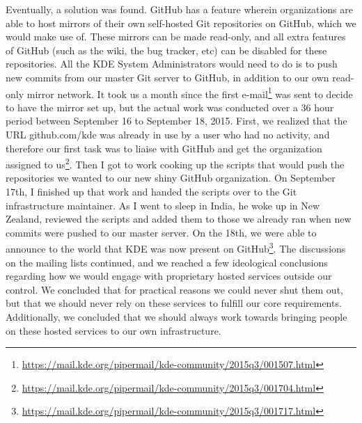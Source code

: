 Eventually, a solution was found. GitHub has a feature wherein organizations are able to host mirrors of their own self-hosted Git repositories on GitHub, which we would make use of. These mirrors can be made read-only, and all extra features of GitHub (such as the wiki, the bug tracker, etc) can be disabled for these repositories. All the KDE System Administrators would need to do is to push new commits from our master Git server to GitHub, in addition to our own read-only mirror network.
It took us a month since the first e-mail\footnote{\url{https://mail.kde.org/pipermail/kde-community/2015q3/001507.html}} was sent to decide to have the mirror set up, but the actual work was conducted over a 36 hour period between September 16 to September 18, 2015. First, we realized that the URL github.com/kde was already in use by a user who had no activity, and therefore our first task was to liaise with GitHub and get the organization assigned to us\footnote{\url{https://mail.kde.org/pipermail/kde-community/2015q3/001704.html}}. Then I got to work cooking up the scripts that would push the repositories we wanted to our new shiny GitHub organization. On September 17th, I finished up that work and handed the scripts over to the Git infrastructure maintainer. As I went to sleep in India, he woke up in New Zealand, reviewed the scripts and added them to those we already ran when new commits were pushed to our master server. On the 18th, we were able to announce to the world that KDE was now present on GitHub\footnote{\url{https://mail.kde.org/pipermail/kde-community/2015q3/001717.html}}.
The discussions on the mailing lists continued, and we reached a few ideological conclusions regarding how we would engage with proprietary hosted services outside our control. We concluded that for practical reasons we could never shut them out, but that we should never rely on these services to fulfill our core requirements. Additionally, we concluded that we should always work towards bringing people on these hosted services to our own infrastructure.

